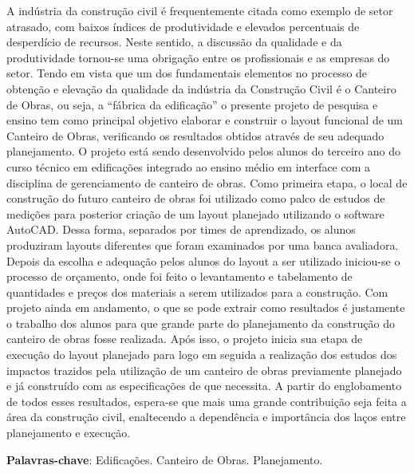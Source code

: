 \documentclass[article,12pt,onesidea,4paper,english,brazil]{abntex2}
\begin{document}
	\noindent 
	A indústria da construção civil é frequentemente citada como exemplo de setor
	atrasado, com baixos índices de produtividade e elevados percentuais de
	desperdício de recursos. Neste sentido, a discussão da qualidade e da produtividade
	tornou-se uma obrigação entre os profissionais e as empresas do setor. Tendo em
	vista que um dos fundamentais elementos no processo de obtenção e elevação da
	qualidade da indústria da Construção Civil é o Canteiro de Obras, ou seja, a “fábrica
	da edificação” o presente projeto de pesquisa e ensino tem como principal objetivo
	elaborar e construir o layout funcional de um Canteiro de Obras, verificando os
	resultados obtidos através de seu adequado planejamento. O projeto está sendo
	desenvolvido pelos alunos do terceiro ano do curso técnico em edificações integrado
	ao ensino médio em interface com a disciplina de gerenciamento de canteiro de
	obras. Como primeira etapa, o local de construção do futuro canteiro de obras foi
	utilizado como palco de estudos de medições para posterior criação de um layout
	planejado utilizando o software AutoCAD. Dessa forma, separados por times de
	aprendizado, os alunos produziram layouts diferentes que foram examinados por
	uma banca avaliadora. Depois da escolha e adequação pelos alunos do layout a ser
	utilizado iniciou-se o processo de orçamento, onde foi feito o levantamento e
	tabelamento de quantidades e preços dos materiais a serem utilizados para a
	construção. Com projeto ainda em andamento, o que se pode extrair como
	resultados é justamente o trabalho dos alunos para que grande parte do
	planejamento da construção do canteiro de obras fosse realizada. Após isso, o
	projeto inicia sua etapa de execução do layout planejado para logo em seguida a
	realização dos estudos dos impactos trazidos pela utilização de um canteiro de
	obras previamente planejado e já construído com as especificações de que
	necessita. A partir do englobamento de todos esses resultados, espera-se que mais
	uma grande contribuição seja feita a área da construção civil, enaltecendo a
	dependência e importância dos laços entre planejamento e execução.
	
	\vspace{\onelineskip}
	
	\noindent
	\textbf{Palavras-chave}: Edificações. Canteiro de Obras. Planejamento.
	
\end{document}
